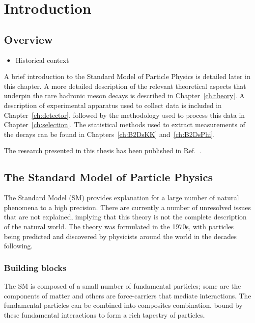 \chapter{Introduction} 
\label{ch:introduction}

\minitoc 



\section{Overview} 


{\color{Red}
\begin{itemize}
\item Historical context 
\end{itemize}}


A brief introduction to the Standard Model of Particle Physics is detailed later in this chapter. A more detailed description of the relevant theoretical aspects that underpin the rare hadronic \B meson decays is described in Chapter~\ref{ch:theory}. A description of experimental apparatus used to collect data is included in Chapter~\ref{ch:detector}, followed by the methodology used to process this data in Chapter~\ref{ch:selection}. The statistical methods used to extract measurements of the decays can be found in Chapters~\ref{ch:B2DsKK} and~\ref{ch:B2DsPhi}.


The research presented in this thesis has been published in Ref.~\cite{LHCb-PAPER-2017-032}. 



\section{The Standard Model of Particle Physics}

The Standard Model (SM) provides explanation for a large number of natural phenomena to a high precision. There are currently a number of unresolved issues that are not explained, implying that this theory is not the complete description of the natural world. The theory was formulated in the 1970s, with particles being predicted and discovered by physicists around the world in the decades following.

\subsection{Building blocks}

The SM is composed of a small number of fundamental particles; some are the components of matter and others are force-carriers that mediate interactions. The fundamental particles can be combined into composites combination, bound by these fundamental interactions to form a rich tapestry of particles.

